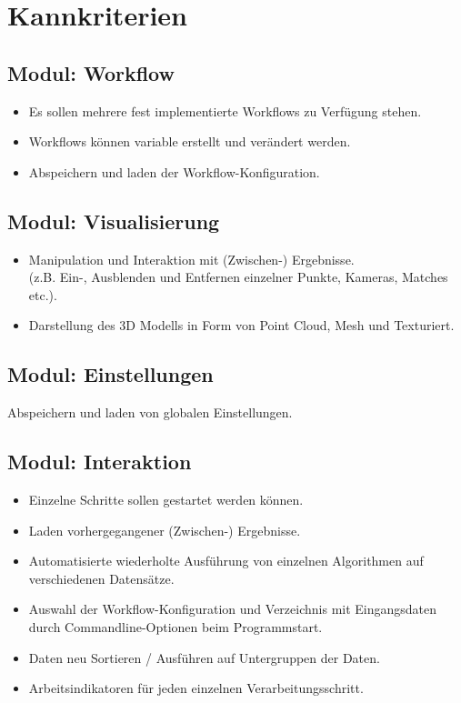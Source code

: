 \section{Kannkriterien}
\subsection{Modul: Workflow}
\begin{itemize}
	\item Es sollen mehrere fest implementierte Workflows zu Verfügung stehen.
	\item Workflows können variable erstellt und verändert werden.
	\item Abspeichern und laden der Workflow-Konfiguration.
\end{itemize}
\subsection{Modul: Visualisierung}
\begin{itemize}
	\item Manipulation und Interaktion mit (Zwischen-) Ergebnisse.\\(z.B. Ein-, Ausblenden und Entfernen einzelner Punkte, Kameras, Matches etc.).
	\item Darstellung des 3D Modells in Form von Point Cloud, Mesh und Texturiert.
\end{itemize}
\subsection{Modul: Einstellungen}
Abspeichern und laden von globalen Einstellungen.
\subsection{Modul: Interaktion}
\begin{itemize}
	\item Einzelne Schritte sollen gestartet werden können.
	\item Laden vorhergegangener (Zwischen-) Ergebnisse.
	\item Automatisierte wiederholte Ausführung von einzelnen Algorithmen auf verschiedenen Datensätze.
	\item Auswahl der Workflow-Konfiguration und Verzeichnis mit Eingangsdaten durch Commandline-Optionen beim Programmstart.
	\item Daten neu Sortieren / Ausführen auf Untergruppen der Daten.
	\item Arbeitsindikatoren für jeden einzelnen Verarbeitungsschritt.
\end{itemize}
